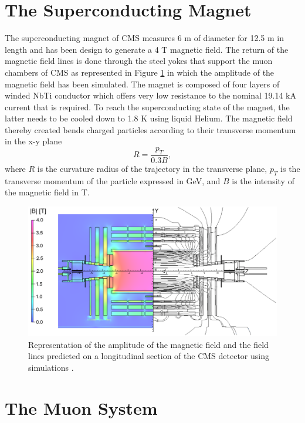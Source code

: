   \section{The Superconducting Magnet}

    The superconducting magnet of CMS measures 6 m of diameter for 12.5 m in length and has been design to generate a 4 T magnetic field. The return of the magnetic field lines is done through the steel yokes that support the muon chambers of CMS as represented in Figure  \ref{fig:I-3-cms-magnet} in which the amplitude of the magnetic field has been simulated. The magnet is composed of four layers of winded NbTi conductor which offers very low resistance to the nominal 19.14 kA current that is required. To reach the superconducting state of the magnet, the latter needs to be cooled down to 1.8 K using liquid Helium. The magnetic field thereby created bends charged particles according to their transverse momentum in the x-y plane
    \begin{equation}
      R = \frac{p_T}{0.3 B} ,
    \end{equation}
    where $ R $ is the curvature radius of the trajectory in the transverse plane, $ p_T $ is the transverse momentum of the particle expressed in GeV, and $ B $ is the intensity of the magnetic field in T.

    \begin{figure}[h!]
      \centering
      \includegraphics[width=\textwidth]{img/I-3-cms/magnet.png}
      \caption{Representation of the amplitude of the magnetic field and the field lines predicted on a longitudinal section of the CMS detector using simulations \cite{Chatrchyan:2009si}.}
      \label{fig:I-3-cms-magnet}
    \end{figure}

  \section{The Muon System}

